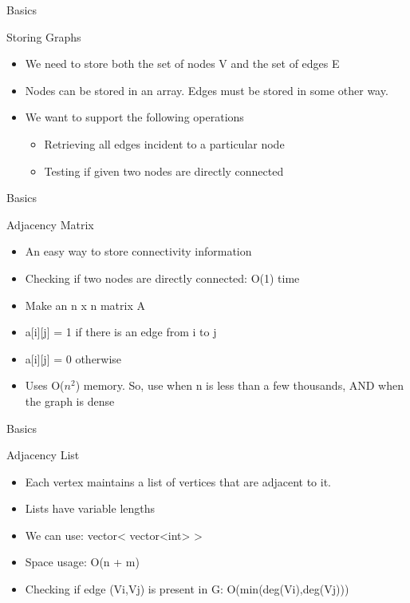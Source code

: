 \documentclass{beamer}
\begin{document}
\begin{frame}[<+->]{Basics}
\begin{block}{Storing Graphs}
  \begin{itemize}
    \item We need to store both the set of nodes V and the set of edges E
    \item Nodes can be stored in an array. Edges must be stored in some other way.
    \item We want to support the following operations\\
      \begin{itemize}
	\item Retrieving all edges incident to a particular node
	\item Testing if given two nodes are directly connected
      \end{itemize}
  \end{itemize}
\end{block}
\end{frame}

\begin{frame}[<+->]{Basics}
\begin{block}{Adjacency Matrix}
  \begin{itemize}
    \item An easy way to store connectivity information
    \item Checking if two nodes are directly connected: O(1) time
    \item Make an n x n matrix A
    \item a[i][j] = 1 if there is an edge from i to j
    \item a[i][j] = 0 otherwise
    \item Uses O($n^2$) memory. So, use when n is less than a few thousands, AND when the graph is dense
  \end{itemize}
\end{block}
\end{frame}

\begin{frame}[<+->]{Basics}
\begin{block}{Adjacency List}
  \begin{itemize}
    \item Each vertex maintains a list of vertices that are adjacent to it.
    \item Lists have variable lengths
    \item We can use: vector< vector<int> >
    \item Space usage: O(n + m)
    \item Checking if edge (Vi,Vj) is present in G: \pause O(min(deg(Vi),deg(Vj)))
  \end{itemize}
\end{block}
\end{frame}
\end{document}
